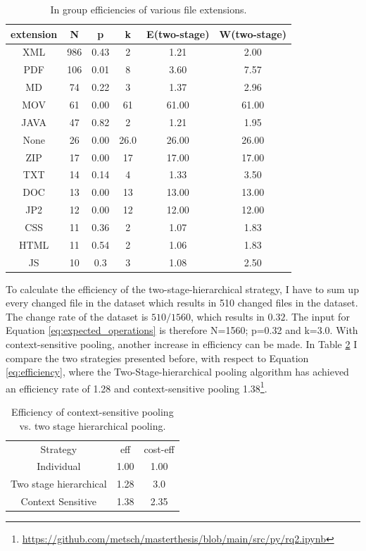 \documentclass[final]{vutinfth}
\begin{document}
\begin{table}[t]
    \centering
    \begin{tabular}{ c c c c c c}
        extension & N & p & k & E(\acrshort{two-stage}) & W(\acrshort{two-stage}) \\
        \hline
        XML & 986 & 0.43 & 2 & 1.21  & 2.00 \\  
        \hline
        PDF &106 &0.01 & 8 &  3.60 & 7.57 \\
        \hline
        MD & 74 & 0.22  & 3 & 1.37 & 2.96 \\    
        \hline
        MOV&61 & 0.00 &  61 & 61.00 & 61.00 \\  
     \hline
     JAVA &47 &0.82 & 2  & 1.21 & 1.95 \\  
     \hline
     None & 26 & 0.00 & 26.0 & 26.00 & 26.00	 \\
     \hline
     ZIP & 17 &0.00 &  17 & 17.00 & 17.00 \\
     \hline
     TXT & 14 & 0.14 &  4 & 1.33 & 3.50 \\ 
     \hline
     DOC & 13 & 0.00 &  13 & 13.00 & 13.00 \\   
     \hline
     JP2 & 12 & 0.00 &  12 & 12.00 & 12.00 \\   
     \hline
     CSS & 11 & 0.36 & 2  & 1.07 & 1.83 \\  
     \hline
     HTML & 11 & 0.54 &  2 & 1.06 & 1.83
     \\   
     \hline
     JS & 10 & 0.3 & 3& 1.08 & 2.50
    \end{tabular}
    \caption{In group efficiencies of various file extensions.}
    \label{tb:efficiency}
\end{table}

To calculate the efficiency of the two-stage-hierarchical strategy, I have to sum up every changed file in the dataset which results in 510 changed files in the dataset. The change rate of the dataset is $510/1560$, which results in $0.32$. The input for Equation \ref{eq:expected_operations} is therefore N=1560; p=0.32 and k=3.0.
With context-sensitive pooling, another increase in efficiency can be made. In Table \ref{tb:context-sensitive} I compare the two strategies presented before, with respect to Equation \ref{eq:efficiency}, where the Two-Stage-hierarchical pooling algorithm has achieved an efficiency rate of 1.28 and context-sensitive pooling 1.38\footnote{\url{https://github.com/metsch/masterthesis/blob/main/src/py/rq2.ipynb}}. 
\begin{table}[t]
    \centering
    \begin{tabular}{c c c}
        Strategy & \acrshort{eff} & \acrshort{cost-eff} \\
        Individual & 1.00 & 1.00 \\
        Two stage hierarchical &  1.28 & 3.0\\
        Context Sensitive & 1.38 & 2.35
    \end{tabular}
    \caption{Efficiency of context-sensitive pooling vs. two stage hierarchical pooling.}
    \label{tb:context-sensitive}
\end{table}
\end{document}
